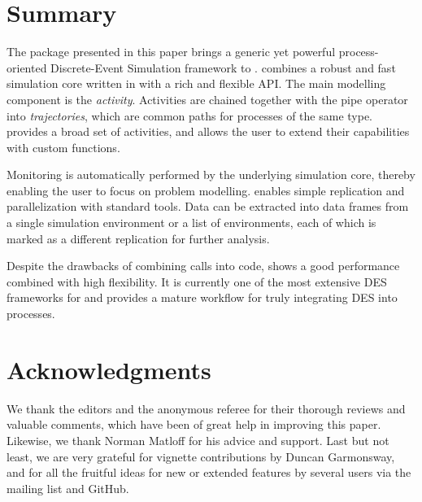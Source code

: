 \documentclass[
  nojss]{jss}
\begin{document}
\hypertarget{summary}{%
\section{Summary}\label{summary}}

The  package presented in this paper brings a generic yet
powerful process-oriented Discrete-Event Simulation framework to
.  combines a robust and fast simulation core
written in  with a rich and flexible  API. The
main modelling component is the \emph{activity}. Activities are chained
together with the pipe operator into \emph{trajectories}, which are
common paths for processes of the same type.  provides a
broad set of activities, and allows the user to extend their
capabilities with custom  functions.

Monitoring is automatically performed by the underlying simulation core,
thereby enabling the user to focus on problem modelling. 
enables simple replication and parallelization with standard
 tools. Data can be extracted into  data frames
from a single simulation environment or a list of environments, each of
which is marked as a different replication for further analysis.

Despite the drawbacks of combining  calls into
 code,  shows a good performance combined with
high flexibility. It is currently one of the most extensive DES
frameworks for  and provides a mature workflow for truly
integrating DES into  processes.

\section*{Acknowledgments}

We thank the editors and the anonymous referee for their thorough
reviews and valuable comments, which have been of great help in
improving this paper. Likewise, we thank Norman Matloff for his advice
and support. Last but not least, we are very grateful for vignette
contributions by Duncan Garmonsway, and for all the fruitful ideas for
new or extended features by several users via the 
mailing list and GitHub.

\renewcommand\refname{References}

\end{document}
